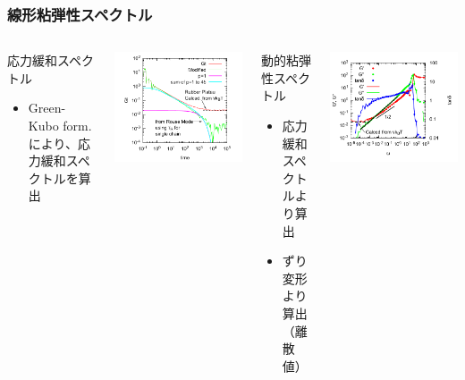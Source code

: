 \documentclass[11pt, dvipdfmx]{beamer}
\begin{document}
\begin{frame}
\frametitle{線形粘弾性スペクトル}
\vspace{-2mm}
\begin{columns}[totalwidth=1\textwidth]
\begin{block}{応力緩和スペクトル}
\begin{itemize}
\small
\item
Green-Kubo form. により、応力緩和スペクトルを算出
\end{itemize}
\end{block}
\centering
\includegraphics[width=\columnwidth]{./fig/Gt_loglog.pdf}
\begin{exampleblock}{動的粘弾性スペクトル}
\begin{itemize}
\small
\item
応力緩和スペクトルより算出
\item
ずり変形より算出（離散値）
\end{itemize}
\end{exampleblock}
\centering
\includegraphics[width=\columnwidth]{./fig/N_44_Freq_Sweep.pdf}

\end{columns}
\end{frame}
\end{document}
